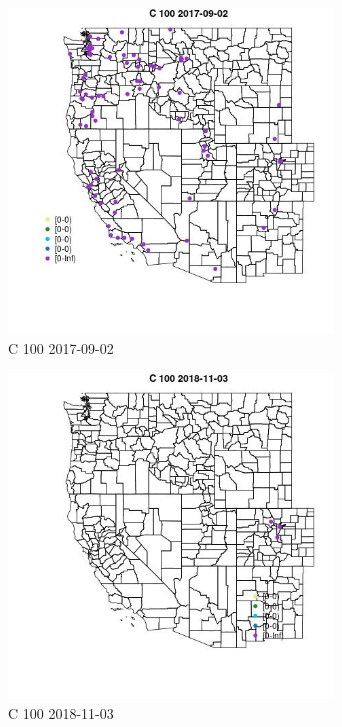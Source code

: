 \begin{figure} 
\centering  
\includegraphics[width=0.77\textwidth]{Code_Outputs/Report_ML_input_PM25_Step4_part_e_de_duplicated_aveswNAs_MapObsC_1002017-09-02.jpg} 
\caption{\label{fig:Report_ML_input_PM25_Step4_part_e_de_duplicated_aveswNAsMapObsC_1002017-09-02}C 100 2017-09-02} 
\end{figure} 
 

\begin{figure} 
\centering  
\includegraphics[width=0.77\textwidth]{Code_Outputs/Report_ML_input_PM25_Step4_part_e_de_duplicated_aveswNAs_MapObsC_1002018-11-03.jpg} 
\caption{\label{fig:Report_ML_input_PM25_Step4_part_e_de_duplicated_aveswNAsMapObsC_1002018-11-03}C 100 2018-11-03} 
\end{figure} 
 


